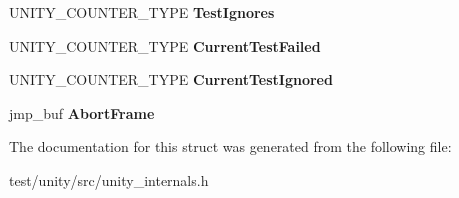 \begin{DoxyCompactItemize}
U\+N\+I\+T\+Y\+\_\+\+C\+O\+U\+N\+T\+E\+R\+\_\+\+T\+Y\+PE {\bfseries Test\+Ignores}
\item 
\mbox{\label{structUNITY__STORAGE__T_a075c6b1282c77d13bf2cc4501283da41}} 
U\+N\+I\+T\+Y\+\_\+\+C\+O\+U\+N\+T\+E\+R\+\_\+\+T\+Y\+PE {\bfseries Current\+Test\+Failed}
\item 
\mbox{\label{structUNITY__STORAGE__T_a88913ed616a6eb58f3b45b281b7b1ff4}} 
U\+N\+I\+T\+Y\+\_\+\+C\+O\+U\+N\+T\+E\+R\+\_\+\+T\+Y\+PE {\bfseries Current\+Test\+Ignored}
\item 
\mbox{\label{structUNITY__STORAGE__T_a4456e2d39fb2858a0406594a1606d21c}} 
jmp\+\_\+buf {\bfseries Abort\+Frame}
\end{DoxyCompactItemize}


The documentation for this struct was generated from the following file\+:\begin{DoxyCompactItemize}
\item 
test/unity/src/unity\+\_\+internals.\+h\end{DoxyCompactItemize}
